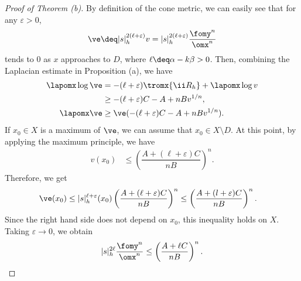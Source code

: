 \documentclass[12pt]{amsart}
\begin{document}
\begin{proof}[Proof of Theorem  (b)]
 By definition of the cone metric, we can easily see that for any $\varepsilon>0$, 
\begin{align*}
	\ve 
		\deq |s|_h^{2(\ell+ \varepsilon)}  v = |s|_h^{2(\ell+ \varepsilon)}   \dfrac{\fomy^n}{\omx^n}
\end{align*}
tends to $0$ as $x$ approaches to $D$, where $\ell \deq \alpha - k \beta>0$. 
Then, combining the Laplacian estimate in Proposition  (a), we have 
\begin{align*}
\lapomx \log \ve 
	&= -  (\ell +\varepsilon ) \tromx{ \ii R_h } + \lapomx \log v  \\
	&\ge -(\ell +\varepsilon) C  - A  + nB  v^{1/n},  \\
\lapomx \ve 
	&\ge \ve ( -(\ell+\varepsilon) C  - A  + nB v^{1/n} ) .
\end{align*}
If $x_0 \in X$ is a maximum of $\ve $, we can assume that $x_0 \in X\setminus D$. At this point, by applying the maximum principle, we have 
\begin{align*}
	v (x_0)
		&\le \left( \dfrac{A+(\ell+\varepsilon)C }{nB} \right)^n.
\end{align*}
Therefore, we get
\begin{align*}
\ve (x_0)
		& \le  |s|_h^{\ell+ \varepsilon}(x_0) \left( \dfrac{A+(\ell+\varepsilon)C }{nB} \right)^n 
		\le \left( \dfrac{A+(l+\varepsilon)C }{nB} \right)^n.
\end{align*}
Since the right hand side does not depend on $x_0$, this inequality holds on $X$. Taking $\varepsilon\rightarrow 0$, we obtain
\begin{align*}
	|s|_h^{2\ell} \dfrac{\fomy^n}{\omx^n}\le \left( \dfrac{A+\ell C }{nB} \right)^n.
\end{align*}
\end{proof}





\nocite{*} 

{\footnotesize

}
\end{document}
